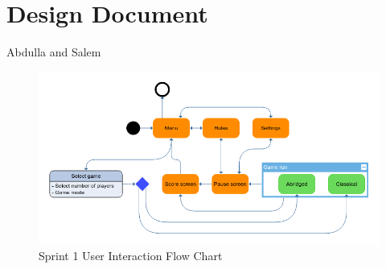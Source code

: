 
\section{Design Document}

Abdulla and Salem

\begin{figure}[h]
    \centering
    \includegraphics[width=0.7\columnwidth]{../Sprint 1 UML/Sprint 1.png}
    \caption{Sprint 1 User Interaction Flow Chart}
    \label{fig:Sprint1UserIO}
\end{figure}

